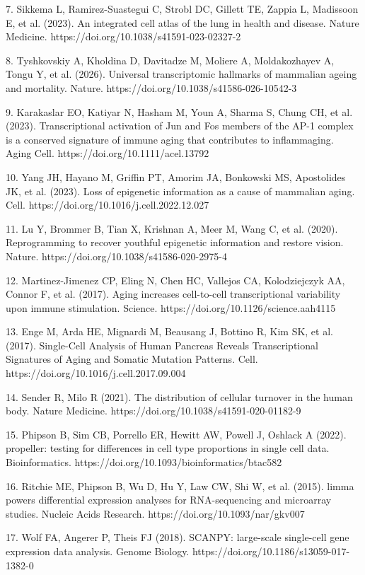 \documentclass[11pt]{article}
\begin{document}
7. Sikkema L, Ramirez-Suastegui C, Strobl DC, Gillett TE, Zappia L, Madissoon E, et al. (2023). An integrated cell atlas of the lung in health and disease. Nature Medicine. https://doi.org/10.1038/s41591-023-02327-2

8. Tyshkovskiy A, Kholdina D, Davitadze M, Moliere A, Moldakozhayev A, Tongu Y, et al. (2026). Universal transcriptomic hallmarks of mammalian ageing and mortality. Nature. https://doi.org/10.1038/s41586-026-10542-3

9. Karakaslar EO, Katiyar N, Hasham M, Youn A, Sharma S, Chung CH, et al. (2023). Transcriptional activation of Jun and Fos members of the AP-1 complex is a conserved signature of immune aging that contributes to inflammaging. Aging Cell. https://doi.org/10.1111/acel.13792

10. Yang JH, Hayano M, Griffin PT, Amorim JA, Bonkowski MS, Apostolides JK, et al. (2023). Loss of epigenetic information as a cause of mammalian aging. Cell. https://doi.org/10.1016/j.cell.2022.12.027

11. Lu Y, Brommer B, Tian X, Krishnan A, Meer M, Wang C, et al. (2020). Reprogramming to recover youthful epigenetic information and restore vision. Nature. https://doi.org/10.1038/s41586-020-2975-4

12. Martinez-Jimenez CP, Eling N, Chen HC, Vallejos CA, Kolodziejczyk AA, Connor F, et al. (2017). Aging increases cell-to-cell transcriptional variability upon immune stimulation. Science. https://doi.org/10.1126/science.aah4115

13. Enge M, Arda HE, Mignardi M, Beausang J, Bottino R, Kim SK, et al. (2017). Single-Cell Analysis of Human Pancreas Reveals Transcriptional Signatures of Aging and Somatic Mutation Patterns. Cell. https://doi.org/10.1016/j.cell.2017.09.004

14. Sender R, Milo R (2021). The distribution of cellular turnover in the human body. Nature Medicine. https://doi.org/10.1038/s41591-020-01182-9


15. Phipson B, Sim CB, Porrello ER, Hewitt AW, Powell J, Oshlack A (2022). propeller: testing for differences in cell type proportions in single cell data. Bioinformatics. https://doi.org/10.1093/bioinformatics/btac582

16. Ritchie ME, Phipson B, Wu D, Hu Y, Law CW, Shi W, et al. (2015). limma powers differential expression analyses for RNA-sequencing and microarray studies. Nucleic Acids Research. https://doi.org/10.1093/nar/gkv007

17. Wolf FA, Angerer P, Theis FJ (2018). SCANPY: large-scale single-cell gene expression data analysis. Genome Biology. https://doi.org/10.1186/s13059-017-1382-0
\end{document}
